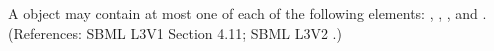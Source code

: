 A \Reaction object may contain at most one of each of the following
elements: , ,
, and .  (References: SBML L3V1 Section 4.11; SBML L3V2
.)
